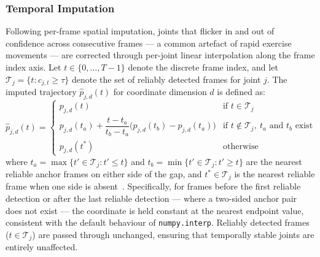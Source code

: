 \documentclass[conference,onecolumn,oneside]{IEEEtran}
\begin{document}
\vspace{0.5cm}
\subsubsection{Temporal Imputation}
\vspace{0.5cm}
Following per-frame spatial imputation, joints that flicker in and out
of confidence across consecutive frames --- a common artefact of rapid
exercise movements --- are corrected through per-joint linear interpolation
along the frame index axis. Let $t \in \{0, \ldots, T-1\}$ denote the
discrete frame index, and let $\mathcal{T}_j = \{t : c_{j,t} \geq \tau\}$
denote the set of reliably detected frames for joint $j$. The imputed
trajectory $\hat{p}_{j,d}(t)$ for coordinate dimension $d$ is defined as:
\begin{equation}
\hat{p}_{j,d}(t) =
\begin{cases}
p_{j,d}(t) & \text{if } t \in \mathcal{T}_j \\[6pt]
p_{j,d}(t_a) + \dfrac{t - t_a}{t_b - t_a}
\bigl(p_{j,d}(t_b) - p_{j,d}(t_a)\bigr)
& \text{if } t \notin \mathcal{T}_j,\ t_a \text{ and } t_b \text{ exist}
\\[6pt]
p_{j,d}(t^*) & \text{otherwise}
\end{cases}
\end{equation}
where $t_a = \max\{t' \in \mathcal{T}_j : t' \leq t\}$ and
$t_b = \min\{t' \in \mathcal{T}_j : t' \geq t\}$ are the nearest reliable
anchor frames on either side of the gap, and $t^* \in \mathcal{T}_j$ is
the nearest reliable frame when one side is absent~\cite{24}.
Specifically, for frames before the first reliable detection or after the
last reliable detection --- where a two-sided anchor pair does not exist ---
the coordinate is held constant at the nearest endpoint value, consistent
with the default behaviour of \texttt{numpy.interp}. Reliably detected
frames ($t \in \mathcal{T}_j$) are passed through unchanged, ensuring
that temporally stable joints are entirely unaffected.

\vspace{0.5cm}
\end{document}
